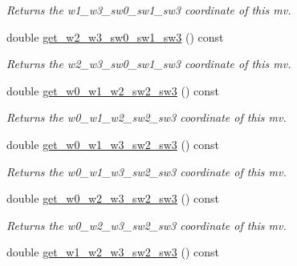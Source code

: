 \begin{DoxyCompactItemize}
\begin{DoxyCompactList}\small\item\em Returns the w1\-\_\-w3\-\_\-sw0\-\_\-sw1\-\_\-sw3 coordinate of this mv. \end{DoxyCompactList}\item 
\hypertarget{classe3ga_1_1mv_a6fd15a6ac7bc750171fcdaacdf3fc0f8}{double \hyperlink{classe3ga_1_1mv_a6fd15a6ac7bc750171fcdaacdf3fc0f8}{get\-\_\-w2\-\_\-w3\-\_\-sw0\-\_\-sw1\-\_\-sw3} () const }\label{classe3ga_1_1mv_a6fd15a6ac7bc750171fcdaacdf3fc0f8}

\begin{DoxyCompactList}\small\item\em Returns the w2\-\_\-w3\-\_\-sw0\-\_\-sw1\-\_\-sw3 coordinate of this mv. \end{DoxyCompactList}\item 
\hypertarget{classe3ga_1_1mv_a913b614085cc0b9ca055f1edfb9b5523}{double \hyperlink{classe3ga_1_1mv_a913b614085cc0b9ca055f1edfb9b5523}{get\-\_\-w0\-\_\-w1\-\_\-w2\-\_\-sw2\-\_\-sw3} () const }\label{classe3ga_1_1mv_a913b614085cc0b9ca055f1edfb9b5523}

\begin{DoxyCompactList}\small\item\em Returns the w0\-\_\-w1\-\_\-w2\-\_\-sw2\-\_\-sw3 coordinate of this mv. \end{DoxyCompactList}\item 
\hypertarget{classe3ga_1_1mv_a1e836cab268a0a8b3ca7a1aaa44ed101}{double \hyperlink{classe3ga_1_1mv_a1e836cab268a0a8b3ca7a1aaa44ed101}{get\-\_\-w0\-\_\-w1\-\_\-w3\-\_\-sw2\-\_\-sw3} () const }\label{classe3ga_1_1mv_a1e836cab268a0a8b3ca7a1aaa44ed101}

\begin{DoxyCompactList}\small\item\em Returns the w0\-\_\-w1\-\_\-w3\-\_\-sw2\-\_\-sw3 coordinate of this mv. \end{DoxyCompactList}\item 
\hypertarget{classe3ga_1_1mv_a69326de10de390092d98d04abbb845e9}{double \hyperlink{classe3ga_1_1mv_a69326de10de390092d98d04abbb845e9}{get\-\_\-w0\-\_\-w2\-\_\-w3\-\_\-sw2\-\_\-sw3} () const }\label{classe3ga_1_1mv_a69326de10de390092d98d04abbb845e9}

\begin{DoxyCompactList}\small\item\em Returns the w0\-\_\-w2\-\_\-w3\-\_\-sw2\-\_\-sw3 coordinate of this mv. \end{DoxyCompactList}\item 
\hypertarget{classe3ga_1_1mv_af1c792a100173ecda3fc356cbdd42cf7}{double \hyperlink{classe3ga_1_1mv_af1c792a100173ecda3fc356cbdd42cf7}{get\-\_\-w1\-\_\-w2\-\_\-w3\-\_\-sw2\-\_\-sw3} () const }\label{classe3ga_1_1mv_af1c792a100173ecda3fc356cbdd42cf7}


\end{DoxyCompactItemize}
